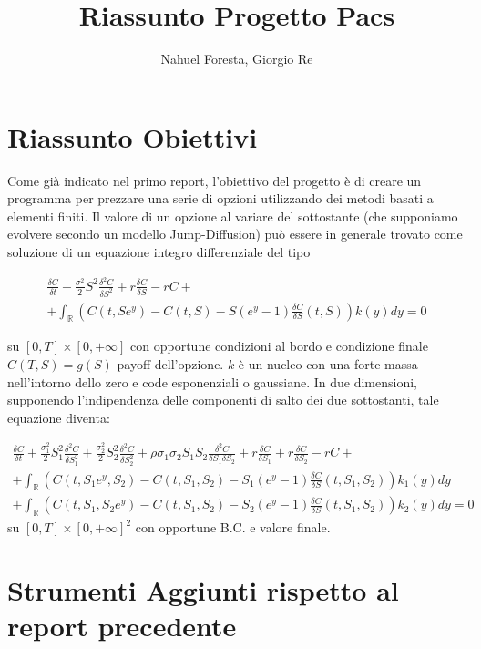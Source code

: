 \documentclass[a4paper,10pt]{article}
\title{Riassunto Progetto Pacs}
\author{Nahuel Foresta, Giorgio Re}
\newcommand{\der}[2]{\frac{\delta #1}{\delta #2}}
\newcommand{\dder}[2]{\frac{\delta^2 #1}{\delta #2^2}}
\newcommand{\dmix}[3]{\frac{\delta^2 #1}{\delta #2 \delta #3}}
\begin{document}
\maketitle

\section{Riassunto Obiettivi}

Come gi\`a indicato nel primo report, l'obiettivo del progetto è di creare un programma per prezzare una serie di opzioni utilizzando dei metodi basati a elementi finiti. Il valore di un opzione al variare del sottostante (che supponiamo evolvere secondo un modello Jump-Diffusion) può essere in generale trovato come soluzione di un equazione integro differenziale del tipo

\begin{multline}
\der{C}{t}+\frac{\sigma^2}{2}S^2\dder{C}{S}+r\der{C}{S}-rC+\\+ \int_\mathbb{R}\left(C(t,Se^y)-C(t,S)-S(e^y-1)\der{C}{S}(t,S)\right)k(y)dy=0
\end{multline}

su $[0,T]\times[0,+\infty]$ con opportune condizioni al bordo e condizione finale $C(T,S)=g(S)$ payoff dell'opzione. $k$ è un nucleo con una forte massa nell'intorno dello zero e code esponenziali o gaussiane.
In due dimensioni, supponendo l'indipendenza delle componenti di salto dei due sottostanti, tale equazione diventa:


\begin{multline}
 \der{C}{t}+\frac{\sigma_1^2}{2}S_1^2\dder{C}{S_1}+\frac{\sigma_2^2}{2}S_2^2\dder{C}{S_2}+\rho\sigma_1\sigma_2 S_1 S_2 \dmix{C}{S_1}{S_2}+
 r\der{C}{S_1}+r\der{C}{S_2}-rC+ \\
 + \int_\mathbb{R}\left(C(t,S_1e^{y},S_2)-C(t,S_1,S_2)-S_1(e^y-1)\der{C}{S}(t,S_1,S_2)\right)k_1(y)dy\\
 + \int_\mathbb{R}\left(C(t,S_1,S_2e^{y})-C(t,S_1,S_2)-S_2(e^y-1)\der{C}{S}(t,S_1,S_2)\right)k_2(y)dy=0 
\end{multline}
su $[0,T]\times[0,+\infty]^2$ con opportune B.C. e valore finale.

\section{Strumenti Aggiunti rispetto al report precedente}
\end{document}
